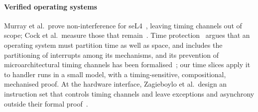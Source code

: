 \paragraph{Verified operating systems} Murray et al.\ prove non-interference for
seL4~\cite{murray2012,murray2013}, leaving timing channels out of scope; Cock et al.\
measure those that remain~\cite{cock2014}. Time
protection~\cite{ge2019} argues that an operating system must partition time as well
as space, and includes the partitioning of interrupts among its
mechanisms, and its prevention
of microarchitectural timing channels has been formalised~\cite{sison2023}\todo{check}; our time slices
apply it to handler runs in a small model, with a timing-sensitive, compositional,
mechanised proof. At the hardware interface, Zagieboylo et
al.\ design an instruction set that controls timing channels and leave exceptions and
asynchrony outside their formal proof~\cite{zagieboylo2019}.
